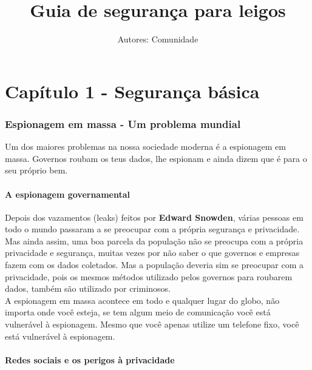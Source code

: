 \documentclass[12pt, letterpaper, Monospace:12]{report}
\title{\Huge Guia de seguran\c{c}a para leigos} %
\author{Autores: Comunidade} %
\begin{document}
\maketitle %
\tableofcontents

\pagebreak %

\part{Capítulo 1 - Segurança básica}

\section{Espionagem em massa - Um problema mundial} %

\large Um dos maiores problemas na nossa sociedade moderna é a espionagem em massa. Governos roubam os teus dados, lhe espionam e ainda dizem que é para o seu próprio bem.\\

\subsection{A espionagem governamental}

	Depois dos vazamentos (leaks) feitos por \textbf{Edward Snowden}, várias pessoas em todo o mundo passaram a se preocupar com a própria segurança e privacidade. Mas ainda assim, uma boa parcela da população não se preocupa com a própria privacidade e segurança, muitas vezes por não saber o que governos e empresas fazem com os dados coletados. Mas a população deveria sim se  preocupar com a privacidade, pois os mesmos métodos utilizado pelos governos para roubarem dados, também são utilizado por criminosos.\\

	A espionagem em massa acontece em todo e qualquer lugar do globo, não importa onde você esteja, se tem algum meio de comunicação você está vulnerável à espionagem. Mesmo que você apenas utilize um telefone fixo, você está vulnerável à espionagem.\\

\subsection{Redes sociais e os perigos à privacidade}
\end{document}
